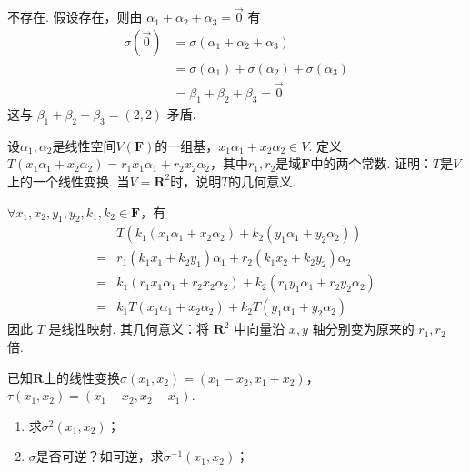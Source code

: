 \begin{exercise}
\begin{exgroup}
        \begin{answer}
            不存在. 假设存在，则由 $ \alpha_1 + \alpha_2 + \alpha_3 = \vec{0} $ 有
          \begin{align*}
              \sigma(\vec{0}) & = \sigma(\alpha_1 + \alpha_2 + \alpha_3)                 \\
                              & = \sigma(\alpha_1) + \sigma(\alpha_2) + \sigma(\alpha_3) \\
                              & = \beta_1 + \beta_2 + \beta_3 = \vec{0}
          \end{align*}
          这与 $ \beta_1 + \beta_2 + \beta_3 = (2, 2) $ 矛盾.
        \end{answer}

        \item 设$\alpha_1,\alpha_2$是线性空间$V(\mathbf{F})$的一组基，$x_1\alpha_1+x_2\alpha_2 \in V$. 定义$T(x_1\alpha_1+x_2\alpha_2)=r_1x_1\alpha_1+r_2x_2\alpha_2$，其中$r_1,r_2$是域$\mathbf{F}$中的两个常数. 证明：$T$是$V$上的一个线性变换. 当$V=\mathbf{R}^2$时，说明$T$的几何意义.

        \begin{answer}
            $ \forall x_1, x_2, y_1, y_2, k_1, k_2 \in \mathbf{F} $，有
          \begin{align*}
                  & T(k_1(x_1 \alpha_1 + x_2 \alpha_2) + k_2(y_1 \alpha_1 + y_2 \alpha_2))                \\
              ={} & r_1(k_1 x_1 + k_2 y_1) \alpha_1 + r_2(k_1 x_2 + k_2 y_2) \alpha_2                     \\
              ={} & k_1 (r_1 x_1 \alpha_1 + r_2 x_2 \alpha_2) + k_2 (r_1 y_1 \alpha_1 + r_2 y_2 \alpha_2) \\
              ={} & k_1 T(x_1 \alpha_1 + x_2 \alpha_2) + k_2 T(y_1 \alpha_1 + y_2 \alpha_2)
          \end{align*}
          因此 $ T $ 是线性映射. 其几何意义：将 $ \mathbf{R}^2 $ 中向量沿 $ x, y $ 轴分别变为原来的 $ r_1, r_2 $ 倍.
        \end{answer}


        \item 已知$\mathbf{R}$上的线性变换$\sigma(x_1,x_2)=(x_1-x_2,x_1+x_2)$，$\tau(x_1,x_2)=(x_1-x_2,x_2-x_1)$.
        \begin{enumerate}
            \item 求$\sigma^2(x_1,x_2)$；

            \item $\sigma$是否可逆？如可逆，求$\sigma^{-1}(x_1,x_2)$；


\end{enumerate}
\end{exgroup}
\end{exercise}

